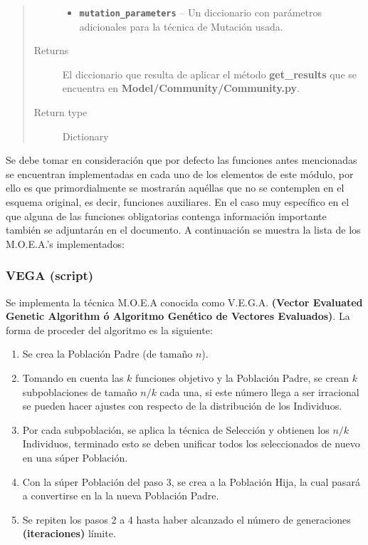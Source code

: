 \documentclass[class=report, crop=false]{standalone}
\begin{document}
\begin{fulllineitems}
\begin{quote}
\begin{description}
\begin{itemize}
\item \textbf{\texttt{mutation\_parameters}} -- Un diccionario con parámetros adicionales para la técnica de Mutación usada.
\end{itemize}
\item[{Returns}] \leavevmode
El diccionario que resulta de aplicar el método \textbf{get\_results} que se encuentra en \textbf{Model/Community/Community.py}.
\item[{Return type}] \leavevmode
Dictionary
\end{description}\end{quote}

\end{fulllineitems}

Se debe tomar en consideración que por defecto las funciones antes 
mencionadas se encuentran implementadas en cada uno de los elementos de 
este módulo, por ello es que primordialmente se mostrarán aquéllas que 
no se contemplen en el esquema original, es decir, funciones auxiliares.\break
En el caso muy específico en el que alguna de las funciones obligatorias 
contenga información importante también se adjuntarán en el documento.\medskip\break  
A continuación se muestra la lista de los M.O.E.A.'s 
implementados:

\subsubsection{VEGA (script)}
\label{sec:a_2_6_1}
Se implementa la técnica M.O.E.A conocida como 
V.E.G.A. \textbf{(Vector Evaluated Genetic Algorithm ó Algoritmo Genético de Vectores Evaluados)}.\break
La forma de proceder del algoritmo es la siguiente:

\begin{enumerate} 
\item Se crea la Población Padre (de tamaño \(n\)).
\item Tomando en cuenta las \(k\) funciones objetivo y la Población Padre, se crean \(k\) subpoblaciones de tamaño \(n/k\) cada una, si este número llega a ser irracional se pueden hacer ajustes con respecto de la distribución de los Individuos.
\item Por cada subpoblación, se aplica la técnica de Selección y obtienen los \(n/k\) Individuos, terminado esto se deben unificar todos los seleccionados de nuevo en una súper Población.
\item Con la súper Población del paso 3, se crea a la Población Hija, la cual pasará a convertirse en la la nueva Población Padre.
\item Se repiten los pasos 2 a 4 hasta haber alcanzado el número de generaciones \textbf{(iteraciones)} límite.
\end{enumerate}
\end{document}
